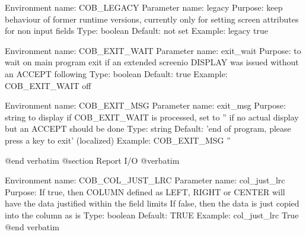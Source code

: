 Environment name:  COB_LEGACY
  Parameter name:  legacy
         Purpose:  keep behaviour of former runtime versions, currently only
                   for setting screen attributes for non input fields
            Type:  boolean
         Default:  not set
         Example:  legacy true

Environment name:  COB_EXIT_WAIT
  Parameter name:  exit_wait
         Purpose:  to wait on main program exit if an extended screenio
                   DISPLAY was issued without an ACCEPT following
            Type:  boolean
         Default:  true
         Example:  COB_EXIT_WAIT off

Environment name:  COB_EXIT_MSG
  Parameter name:  exit_msg
         Purpose:  string to display if COB_EXIT_WAIT is processed, set to ''
                   if no actual display but an ACCEPT should be done
            Type:  string
         Default:  'end of program, please press a key to exit' (localized)
         Example:  COB_EXIT_MSG ''


@end verbatim
@section Report I/O
@verbatim


Environment name:  COB_COL_JUST_LRC
  Parameter name:  col_just_lrc
         Purpose:  If true, then COLUMN defined as LEFT, RIGHT or CENTER
                   will have the data justified within the field limits
                   If false, then the data is just copied into the column as is
            Type:  boolean
         Default:  TRUE
         Example:  col_just_lrc True
@end verbatim
